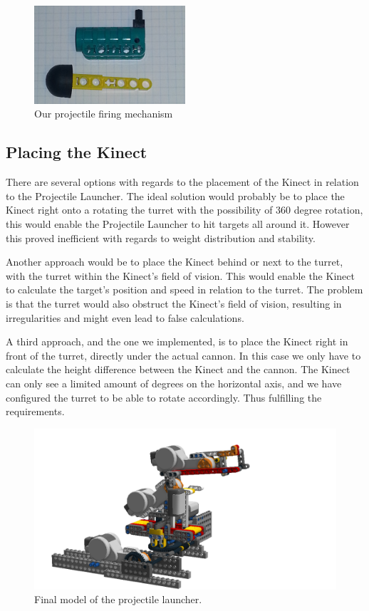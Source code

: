 \begin{figure}[hptb]
  \centering
    \includegraphics[width=0.5\textwidth]{img/competition_cannon.png}
  \caption{Our projectile firing mechanism}
  \label{competition_cannon}
\end{figure}

\subsection{Placing the Kinect} %
\label{sub:placing_the_kinect}
There are several options with regards to the placement of the Kinect in relation to the Projectile Launcher. The ideal solution would probably be to place the Kinect right onto a rotating the turret with the possibility of 360 degree rotation, this would enable the Projectile Launcher to hit targets all around it. However this proved inefficient with regards to weight distribution and stability.

Another approach would be to place the Kinect behind or next to the turret, with the turret within the Kinect's field of vision. This would enable the Kinect to calculate the target's position and speed in relation to the turret. The problem is that the turret would also obstruct the Kinect's field of vision, resulting in irregularities and might even lead to false calculations.

A third approach, and the one we implemented, is to place the Kinect right in front of the turret, directly under the actual cannon. In this case we only have to calculate the height difference between the Kinect and the cannon. The Kinect can only see a limited amount of degrees on the horizontal axis, and we have configured the turret to be able to rotate accordingly. Thus fulfilling the requirements.

\begin{figure}[hptb]
  \centering
    \includegraphics[width=1.0\textwidth]{img/design_turret4.png}
  \caption{Final model of the projectile launcher.}
  \label{final_model}
\end{figure}
